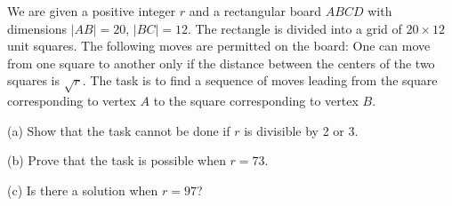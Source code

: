 We are given a positive integer $r$ and a rectangular board $ABCD$ with dimensions $|AB| = 20$, $|BC| = 12$. The rectangle is divided into a grid of $20 \times 12$ unit squares. The following moves are permitted on the board: One can move from one square to another only if the distance between the centers of the two squares is $\sqrt{r}$. The task is to find a sequence of moves leading from the square corresponding to vertex $A$ to the square corresponding to vertex $B$.

(a) Show that the task cannot be done if $r$ is divisible by 2 or 3.

(b) Prove that the task is possible when $r = 73$.

(c) Is there a solution when $r = 97$?
